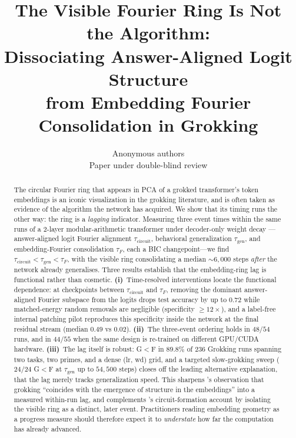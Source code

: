 \documentclass{article}
\title{The Visible Fourier Ring Is Not the Algorithm: \\
       Dissociating Answer-Aligned Logit Structure \\
       from Embedding Fourier Consolidation in Grokking}
\author{
  \name Anonymous authors \\
  \addr Paper under double-blind review
}
\newcommand{\taug}{\tau_{\mathrm{gen}}}
\newcommand{\tauf}{\tau_{F}}
\newcommand{\taucirc}{\tau_{\mathrm{circuit}}}
\begin{document}
\maketitle

\begin{abstract}
The circular Fourier ring that appears in PCA of a grokked
transformer's token embeddings is an iconic visualization in the
grokking literature, and is often taken as evidence of the
algorithm the network has acquired.
We show that its timing runs the other way: the ring is a
\emph{lagging} indicator.
Measuring three event times within the same runs of a 2-layer
modular-arithmetic transformer under decoder-only weight decay
---answer-aligned logit Fourier alignment $\taucirc$,
behavioral generalization $\taug$, and embedding-Fourier
consolidation $\tauf$, each a BIC changepoint---we find
$\taucirc<\taug<\tauf$, with the visible ring consolidating a
median ${\sim}6{,}000$ steps \emph{after} the network already
generalises.
Three results establish that the embedding-ring lag is
functional rather than cosmetic.
\textbf{(i)}~Time-resolved interventions locate the functional
dependence: at checkpoints between $\taucirc$ and $\tauf$,
removing the dominant answer-aligned Fourier subspace from the
logits drops test accuracy by up to $0.72$ while matched-energy
random removals are negligible (specificity ${\geq}12\times$),
and a label-free internal patching pilot reproduces this
specificity inside the network at the final residual stream
(median $0.49$ vs $0.02$).
\textbf{(ii)}~The three-event ordering holds in $48/54$ runs,
and in $44/55$ when the same design is re-trained on different
GPU/CUDA hardware.
\textbf{(iii)}~The lag itself is robust: G${<}$F in $89.8\%$ of
$236$ Grokking runs spanning two tasks, two primes, and a dense
(lr, wd) grid, and a targeted slow-grokking sweep ($24/24$ G$<$F
at $\taug$ up to $54{,}500$ steps) closes off the leading
alternative explanation, that the lag merely tracks
generalization speed.
This sharpens \citet{liu2022towards}'s observation that grokking
``coincides with the emergence of structure in the embeddings''
into a measured within-run lag, and complements
\citet{nanda2023progress}'s circuit-formation account by
isolating the visible ring as a distinct, later event.
Practitioners reading embedding geometry as a progress measure
should therefore expect it to \emph{understate} how far the
computation has already advanced.
\end{abstract}
\end{document}
